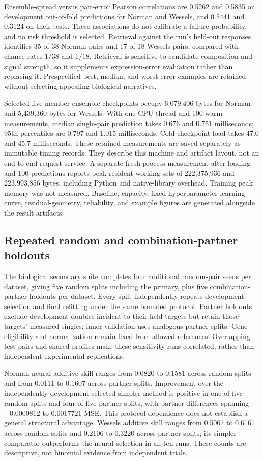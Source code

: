 \documentclass{article}
\begin{document}
Ensemble-spread versus pair-error Pearson correlations are 0.5262 and 0.5835 on development out-of-fold predictions for Norman and Wessels, and 0.5441 and 0.3124 on their tests. These associations do not calibrate a failure probability, and no risk threshold is selected. Retrieval against the run's held-out responses identifies 35 of 38 Norman pairs and 17 of 18 Wessels pairs, compared with chance rates $1/38$ and $1/18$. Retrieval is sensitive to candidate composition and signal strength, so it supplements expression-error evaluation rather than replacing it. Prespecified best, median, and worst error examples are retained without selecting appealing biological narratives.

Selected five-member ensemble checkpoints occupy 6,079,406 bytes for Norman and 5,439,360 bytes for Wessels. With one CPU thread and 100 warm measurements, median single-pair prediction takes 0.676 and 0.751 milliseconds; 95th percentiles are 0.797 and 1.015 milliseconds. Cold checkpoint load takes 47.0 and 45.7 milliseconds. These retained measurements are saved separately as immutable timing records. They describe this machine and artifact layout, not an end-to-end request service. A separate fresh-process measurement after loading and 100 predictions reports peak resident working sets of 222,375,936 and 223,993,856 bytes, including Python and native-library overhead. Training peak memory was not measured. Baseline, capacity, fixed-hyperparameter learning-curve, residual-geometry, reliability, and example figures are generated alongside the result artifacts.

\subsection{Repeated random and combination-partner holdouts}
The biological secondary suite completes four additional random-pair seeds per dataset, giving five random splits including the primary, plus five combination-partner holdouts per dataset. Every split independently repeats development selection and final refitting under the same bounded protocol. Partner holdouts exclude development doubles incident to their held targets but retain those targets' measured singles; inner validation uses analogous partner splits. Gene eligibility and normalization remain fixed from allowed references. Overlapping test pairs and shared profiles make these sensitivity runs correlated, rather than independent experimental replications.

Norman neural additive skill ranges from 0.0820 to 0.1581 across random splits and from 0.0111 to 0.1607 across partner splits. Improvement over the independently development-selected simpler method is positive in one of five random splits and four of five partner splits, with partner differences spanning $-0.0000812$ to $0.0017721$ MSE. This protocol dependence does not establish a general structural advantage. Wessels additive skill ranges from 0.5067 to 0.6161 across random splits and 0.2106 to 0.3220 across partner splits; its simpler comparator outperforms the neural selection in all ten runs. These counts are descriptive, not binomial evidence from independent trials.
\end{document}
